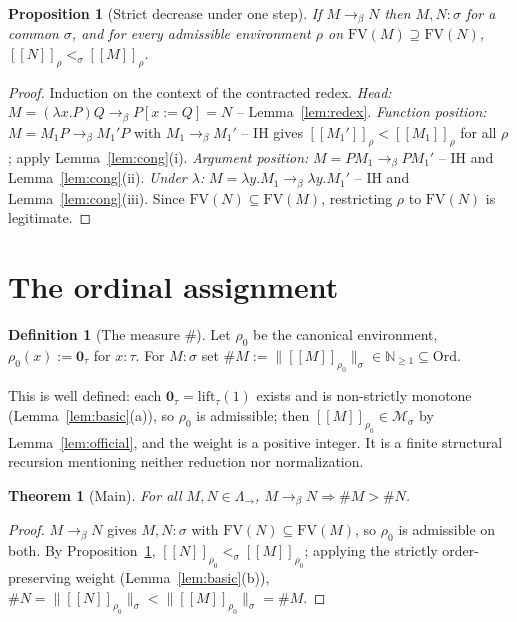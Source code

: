 \documentclass{amsart}
\newtheorem{theorem}{Theorem}
\newtheorem{proposition}{Proposition}
\theoremstyle{definition}
\newtheorem{definition}{Definition}
\newcommand{\Ord}{\mathrm{Ord}}
\newcommand{\interp}[1]{[\![#1]\!]}
\newcommand{\To}{\to_\beta}
\newcommand{\FV}{\mathrm{FV}}
\begin{document}
\begin{proposition}[Strict decrease under one step]\label{prop:step}
If $M\To N$ then $M,N:\sigma$ for a common $\sigma$, and for every admissible environment
$\rho$ on $\FV(M)\supseteq\FV(N)$, $\interp{N}_\rho<_\sigma\interp{M}_\rho$.
\end{proposition}

\begin{proof}
Induction on the context of the contracted redex.
\emph{Head:} $M=(\lambda x.P)Q\To P[x:=Q]=N$ -- Lemma~\ref{lem:redex}.
\emph{Function position:} $M=M_1P\To M_1'P$ with $M_1\To M_1'$ -- IH gives
$\interp{M_1'}_\rho<\interp{M_1}_\rho$ for all $\rho$; apply Lemma~\ref{lem:cong}(i).
\emph{Argument position:} $M=PM_1\To PM_1'$ -- IH and Lemma~\ref{lem:cong}(ii).
\emph{Under $\lambda$:} $M=\lambda y.M_1\To\lambda y.M_1'$ -- IH and
Lemma~\ref{lem:cong}(iii). Since $\FV(N)\subseteq\FV(M)$, restricting $\rho$ to $\FV(N)$ is
legitimate.
\end{proof}

\section{The ordinal assignment}

\begin{definition}[The measure $\#$]\label{def:hash}
Let $\rho_0$ be the canonical environment, $\rho_0(x):=\mathbf 0_\tau$ for $x:\tau$. For
$M:\sigma$ set $\#M:=\|\interp{M}_{\rho_0}\|_\sigma\in\mathbb N_{\ge1}\subseteq\Ord$.
\end{definition}

This is well defined: each $\mathbf 0_\tau=\mathrm{lift}_\tau(1)$ exists and is non-strictly
monotone (Lemma~\ref{lem:basic}(a)), so $\rho_0$ is admissible; then
$\interp{M}_{\rho_0}\in\mathcal M_\sigma$ by Lemma~\ref{lem:official}, and the weight is a
positive integer. It is a finite structural recursion mentioning neither reduction nor
normalization.

\begin{theorem}[Main]\label{thm:main}
For all $M,N\in\Lambda_\to$, $M\To N\Rightarrow\#M>\#N$.
\end{theorem}

\begin{proof}
$M\To N$ gives $M,N:\sigma$ with $\FV(N)\subseteq\FV(M)$, so $\rho_0$ is admissible on both.
By Proposition~\ref{prop:step}, $\interp{N}_{\rho_0}<_\sigma\interp{M}_{\rho_0}$; applying
the strictly order-preserving weight (Lemma~\ref{lem:basic}(b)),
$\#N=\|\interp{N}_{\rho_0}\|_\sigma<\|\interp{M}_{\rho_0}\|_\sigma=\#M$.
\end{proof}
\end{document}
